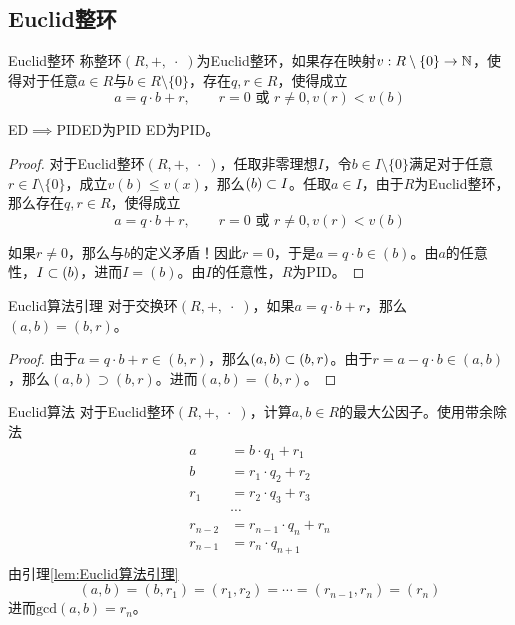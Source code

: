 \subsection{Euclid整环}

\begin{definition}{Euclid整环}
	称整环$(R,+,\;\cdot\;)$为Euclid整环，如果存在映射$v:R\setminus\{0\}\to \mathbb{N}$，使得对于任意$a\in R$与$b\in R\setminus\{0\}$，存在$q,r\in R$，使得成立
	$$
	a=q\cdot b+r,\qquad 
	r=0\text{ 或 }r\ne 0,v(r)<v(b)
	$$
\end{definition}

\begin{theorem}{ED$\implies$PID}{ED为PID}
	ED为PID。
\end{theorem}

\begin{proof}
	对于Euclid整环$(R,+,\;\cdot\;)$，任取非零理想$I$，令$b\in I\setminus\{0\}$满足对于任意$r\in I\setminus\{0\}$，成立$v(b)\le v(x)$，那么$(b)\subset I$。任取$a\in I$，由于$R$为Euclid整环，那么存在$q,r\in R$，使得成立
	$$
	a=q\cdot b+r,\qquad 
	r=0\text{ 或 }r\ne 0,v(r)<v(b)
	$$
	
	如果$r\ne 0$，那么与$b$的定义矛盾！因此$r=0$，于是$a=q\cdot b\in (b)$。由$a$的任意性，$I\subset (b)$，进而$I=(b)$。由$I$的任意性，$R$为PID。
\end{proof}

\begin{lemma}{}{Euclid算法引理}
	对于交换环$(R,+,\;\cdot \;)$，如果$a=q\cdot b+r$，那么$(a,b)=(b,r)$。
\end{lemma}

\begin{proof}
	由于$a=q\cdot b+r\in (b,r)$，那么$(a,b)\subset (b,r)$。由于$r=a-q\cdot b\in (a,b)$，那么$(a,b)\supset (b,r)$。进而$(a,b)=(b,r)$​。
\end{proof}

\begin{definition}{Euclid算法}
	对于Euclid整环$(R,+,\;\cdot \;)$，计算$a,b\in R$的最大公因子。使用带余除法
	\begin{align*}
		a & = b\cdot q_1 + r_1\\
		b & = r_1\cdot q_2 + r_2\\
		r_1 & = r_2\cdot q_3 + r_3\\
		& \cdots\\
		r_{n-2} & = r_{n-1}\cdot q_{n} + r_{n}\\
		r_{n-1} & = r_n\cdot q_{n+1}\\
	\end{align*}
	由引理\ref{lem:Euclid算法引理}
	$$
	(a,b)=
	(b,r_1)=
	(r_1,r_2)=
	\cdots=
	(r_{n-1},r_n)=(r_n)
	$$
	进而$\mathrm{gcd}(a,b)=r_n$。
\end{definition}

